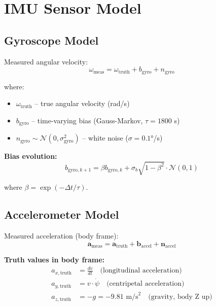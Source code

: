 \documentclass[11pt,a4paper]{article}
\begin{document}
\section{IMU Sensor Model}

\subsection{Gyroscope Model}

Measured angular velocity:
\begin{equation}
\omega_{\text{meas}} = \omega_{\text{truth}} + b_{\text{gyro}} + n_{\text{gyro}}
\end{equation}

where:
\begin{itemize}
    \item $\omega_{\text{truth}}$ -- true angular velocity (rad/s)
    \item $b_{\text{gyro}}$ -- time-varying bias (Gauss-Markov, $\tau = 1800$ s)
    \item $n_{\text{gyro}} \sim \mathcal{N}(0, \sigma_{\text{gyro}}^2)$ -- white noise ($\sigma = 0.1°$/s)
\end{itemize}

\textbf{Bias evolution:}
\begin{equation}
b_{\text{gyro},k+1} = \beta b_{\text{gyro},k} + \sigma_b \sqrt{1 - \beta^2} \cdot \mathcal{N}(0, 1)
\end{equation}

where $\beta = \exp(-\Delta t / \tau)$.

\subsection{Accelerometer Model}

Measured acceleration (body frame):
\begin{equation}
\mathbf{a}_{\text{meas}} = \mathbf{a}_{\text{truth}} + \mathbf{b}_{\text{accel}} + \mathbf{n}_{\text{accel}}
\end{equation}

\textbf{Truth values in body frame:}
\begin{align}
a_{x,\text{truth}} &= \frac{dv}{dt} \quad \text{(longitudinal acceleration)} \\
a_{y,\text{truth}} &= v \cdot \dot{\psi} \quad \text{(centripetal acceleration)} \\
a_{z,\text{truth}} &= -g = -9.81 \text{ m/s}^2 \quad \text{(gravity, body Z up)}
\end{align}
\end{document}
